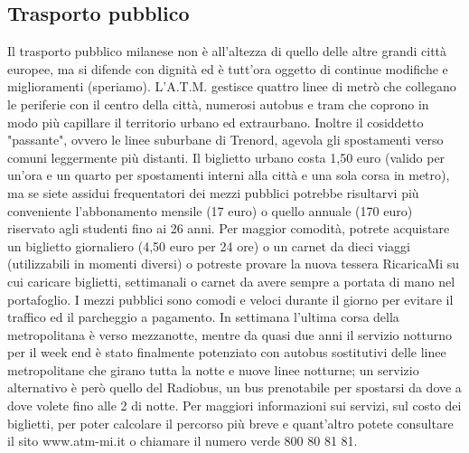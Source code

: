 \subsection{Trasporto pubblico}
Il trasporto pubblico milanese non è all'altezza di quello delle altre grandi città europee, ma si difende con dignità ed è tutt'ora oggetto di continue modifiche e miglioramenti (speriamo). L'A.T.M. gestisce quattro linee di metrò che collegano le periferie con il centro della città, numerosi autobus e tram che coprono in modo più capillare il territorio urbano ed extraurbano. Inoltre il cosiddetto "passante", ovvero le linee suburbane di Trenord, agevola gli spostamenti verso comuni leggermente più distanti. 
Il biglietto urbano costa 1,50 euro (valido per un'ora e un quarto per spostamenti interni alla città e una sola corsa in metro), ma se siete assidui frequentatori dei mezzi pubblici potrebbe risultarvi più conveniente l'abbonamento mensile (17 euro) o quello annuale (170 euro) riservato agli studenti fino ai 26 anni. Per maggior comodità, potrete acquistare un biglietto giornaliero (4,50 euro per 24 ore) o un carnet da dieci viaggi (utilizzabili in momenti diversi) o potreste provare la nuova tessera RicaricaMi su cui caricare biglietti, settimanali o carnet da avere sempre a portata di mano nel portafoglio.
I mezzi pubblici sono comodi e veloci durante il giorno per evitare il traffico ed il parcheggio a pagamento. In settimana l'ultima corsa della metropolitana è verso mezzanotte, mentre da quasi due anni il servizio notturno per il week end è stato finalmente potenziato con autobus sostitutivi delle linee metropolitane che girano tutta la notte e nuove linee notturne; un servizio alternativo è però quello del Radiobus, un bus prenotabile per spostarsi da dove a dove volete fino alle 2 di notte.
Per maggiori informazioni sui servizi, sul costo dei biglietti, per poter calcolare il percorso più breve e quant'altro potete consultare il sito www.atm-mi.it o chiamare il numero verde 800 80 81 81. 
